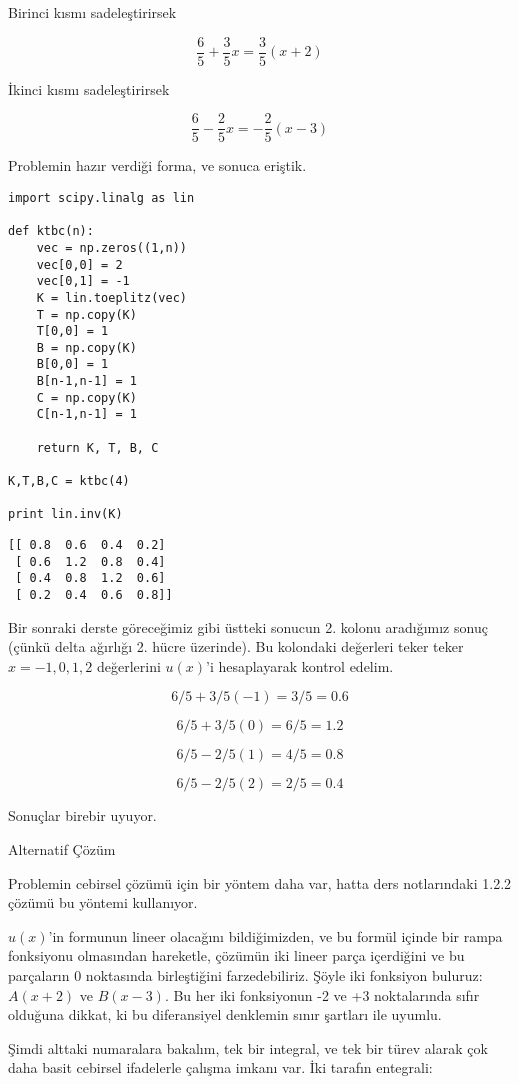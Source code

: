 \documentclass[12pt,fleqn]{article}\usepackage{../../common}
\begin{document}
Birinci kısmı sadeleştirirsek

$$ \frac{6}{5} + \frac{3}{5}x  = \frac{3}{5}(x + 2)  $$

İkinci kısmı sadeleştirirsek

$$ \frac{6}{5} - \frac{2}{5}x =  -\frac{2}{5}(x - 3)$$

Problemin hazır verdiği forma, ve sonuca eriştik.

\begin{verbatim}
import scipy.linalg as lin

def ktbc(n):
    vec = np.zeros((1,n))
    vec[0,0] = 2
    vec[0,1] = -1
    K = lin.toeplitz(vec)
    T = np.copy(K)
    T[0,0] = 1
    B = np.copy(K)
    B[0,0] = 1
    B[n-1,n-1] = 1
    C = np.copy(K)
    C[n-1,n-1] = 1
    
    return K, T, B, C

K,T,B,C = ktbc(4)

print lin.inv(K) 
\end{verbatim}

\begin{verbatim}
[[ 0.8  0.6  0.4  0.2]
 [ 0.6  1.2  0.8  0.4]
 [ 0.4  0.8  1.2  0.6]
 [ 0.2  0.4  0.6  0.8]]
\end{verbatim}

Bir sonraki derste göreceğimiz gibi üstteki sonucun 2. kolonu aradığımız
sonuç (çünkü delta ağırlığı 2. hücre üzerinde). Bu kolondaki değerleri
teker teker $x=-1,0,1,2$ değerlerini $u(x)$'i hesaplayarak kontrol edelim.

$$ 6/5 + 3/5(-1) = 3/5 = 0.6 $$

$$ 6/5 + 3/5(0) = 6/5 = 1.2 $$

$$ 6/5 -2/5(1) = 4/5 = 0.8 $$

$$ 6/5 -2/5(2) = 2/5 = 0.4 $$

Sonuçlar birebir uyuyor. 

Alternatif Çözüm

Problemin cebirsel çözümü için bir yöntem daha var, hatta ders notlarındaki
1.2.2 çözümü bu yöntemi kullanıyor. 

$u(x)$'in formunun lineer olacağını bildiğimizden, ve bu formül içinde bir
rampa fonksiyonu olmasından hareketle, çözümün iki lineer parça içerdiğini
ve bu parçaların 0 noktasında birleştiğini farzedebiliriz. Şöyle iki
fonksiyon buluruz: $A(x+2)$ ve $B(x-3)$. Bu her iki fonksiyonun -2 ve +3
noktalarında sıfır olduğuna dikkat, ki bu diferansiyel denklemin sınır
şartları ile uyumlu.

Şimdi alttaki numaralara bakalım, tek bir integral, ve tek bir türev alarak
çok daha basit cebirsel ifadelerle çalışma imkanı var. İki tarafın
entegrali:
\end{document}
